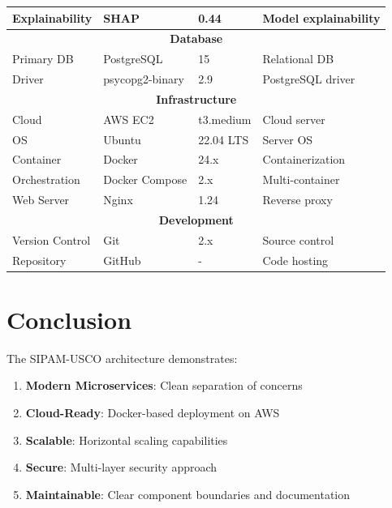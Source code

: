 \documentclass[12pt,a4paper]{report}
\begin{document}
\begin{center}
\begin{longtable}{|l|l|l|l|}
\hline
Explainability & SHAP & 0.44 & Model explainability \\
\hline
\multicolumn{4}{|c|}{\textbf{Database}} \\
\hline
Primary DB & PostgreSQL & 15 & Relational DB \\
\hline
Driver & psycopg2-binary & 2.9 & PostgreSQL driver \\
\hline
\multicolumn{4}{|c|}{\textbf{Infrastructure}} \\
\hline
Cloud & AWS EC2 & t3.medium & Cloud server \\
\hline
OS & Ubuntu & 22.04 LTS & Server OS \\
\hline
Container & Docker & 24.x & Containerization \\
\hline
Orchestration & Docker Compose & 2.x & Multi-container \\
\hline
Web Server & Nginx & 1.24 & Reverse proxy \\
\hline
\multicolumn{4}{|c|}{\textbf{Development}} \\
\hline
Version Control & Git & 2.x & Source control \\
\hline
Repository & GitHub & - & Code hosting \\
\hline
\end{longtable}
\end{center}

\chapter{Conclusion}

The SIPAM-USCO architecture demonstrates:

\begin{enumerate}
    \item \textbf{Modern Microservices}: Clean separation of concerns
    \item \textbf{Cloud-Ready}: Docker-based deployment on AWS
    \item \textbf{Scalable}: Horizontal scaling capabilities
    \item \textbf{Secure}: Multi-layer security approach
    \item \textbf{Maintainable}: Clear component boundaries and documentation
\end{enumerate}
\end{document}
